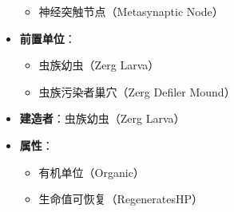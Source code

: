 \begin{tcolorbox}[colback=white, colframe=black!60!white, title=Zerg\_Defiler(), arc=0mm]
\begin{itemize}
\begin{itemize}
                \item 神经突触节点（Metasynaptic Node）
            \end{itemize}
        \item \textbf{前置单位}：
            \begin{itemize}
                \item 虫族幼虫（Zerg Larva）
                \item 虫族污染者巢穴（Zerg Defiler Mound）
            \end{itemize}
        \item \textbf{建造者}：虫族幼虫（Zerg Larva）
        \item \textbf{属性}：
            \begin{itemize}
                \item 有机单位（Organic）
                \item 生命值可恢复（RegeneratesHP）
            \end{itemize}
    \end{itemize}
\end{tcolorbox}

